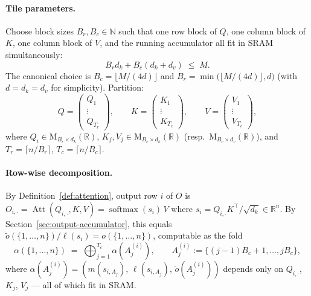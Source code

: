 \documentclass[11pt]{amsart}
\theoremstyle{plain}
\theoremstyle{definition}
\newcommand{\R}{\mathbb{R}}
\newcommand{\N}{\mathbb{N}}
\newcommand{\Mat}[2]{\mathrm{M}_{#1 \times #2}(\R)}
\newcommand{\softmax}{\operatorname{softmax}}
\newcommand{\Att}{\operatorname{Att}}
\begin{document}
\paragraph{Tile parameters.}
Choose block sizes $B_r, B_c \in \N$ such that one row block of $Q$, one
column block of $K$, one column block of $V$, and the running accumulator
all fit in SRAM simultaneously:
\[
    B_r d_k + B_c(d_k + d_v) \;\leq\; M.
\]
The canonical choice is $B_c = \lfloor M/(4d) \rfloor$ and
$B_r = \min\bigl(\lfloor M/(4d) \rfloor, d\bigr)$ (with $d = d_k = d_v$
for simplicity).  Partition:
\[
    Q = \begin{pmatrix} Q_1 \\ \vdots \\ Q_{T_r} \end{pmatrix},
    \qquad
    K = \begin{pmatrix} K_1 \\ \vdots \\ K_{T_c} \end{pmatrix},
    \qquad
    V = \begin{pmatrix} V_1 \\ \vdots \\ V_{T_c} \end{pmatrix},
\]
where $Q_i \in \Mat{B_r}{d_k}$, $K_j, V_j \in \Mat{B_c}{d_k}$ (resp.\
$\Mat{B_c}{d_v}$), and $T_r = \lceil n/B_r \rceil$, $T_c = \lceil n/B_c \rceil$.

\paragraph{Row-wise decomposition.}
By Definition~\ref{def:attention}, output row $i$ of $O$ is
$O_{i,\cdot} = \Att(Q_{i,\cdot}, K, V) = \softmax(s_i)\,V$
where $s_i = Q_{i,\cdot} K^\top / \sqrt{d_k} \in \R^n$.
By Section~\ref{sec:output-accumulator}, this equals
$\tilde{o}(\{1,\ldots,n\}) / \ell(s_i) = o(\{1,\ldots,n\})$,
computable as the fold
\[
    \alpha(\{1,\ldots,n\})
    \;=\;
    \bigoplus_{j=1}^{T_c} \alpha(A_j^{(i)}),
    \qquad
    A_j^{(i)} := \{(j-1)B_c + 1, \ldots, j B_c\},
\]
where $\alpha(A_j^{(i)}) = (m(s_{i,A_j}),\, \ell(s_{i,A_j}),\, \tilde{o}(A_j^{(i)}))$
depends only on $Q_{i,\cdot}$, $K_j$, $V_j$ --- all of which fit in SRAM.
\end{document}
